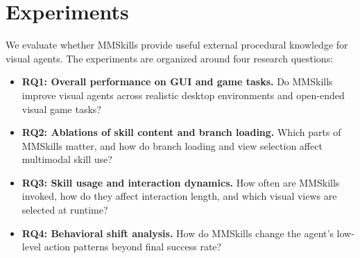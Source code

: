 
\section{Experiments}
\label{sec:experiments}

We evaluate whether MMSkills provide useful external procedural knowledge for visual agents. The experiments are organized around four research questions:



\begin{itemize}[leftmargin=*]
    \item \textbf{RQ1: Overall performance on GUI and game tasks.} Do MMSkills improve visual agents across realistic desktop environments and open-ended visual game tasks?
    \item \textbf{RQ2: Ablations of skill content and branch loading.} Which parts of MMSkills matter, and how do branch loading and view selection affect multimodal skill use?
    \item \textbf{RQ3: Skill usage and interaction dynamics.} How often are MMSkills invoked, how do they affect interaction length, and which visual views are selected at runtime?
    \item \textbf{RQ4: Behavioral shift analysis.} How do MMSkills change the agent's low-level action patterns beyond final success rate?
\end{itemize}

\renewcommand{\mmskillhl}{\cellcolor{mmskillrowpurple}}

